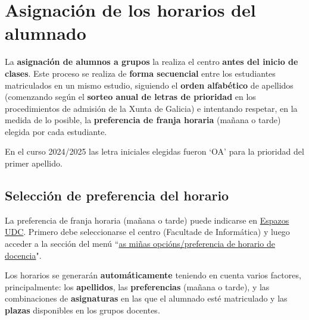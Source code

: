 \section{Asignación de los horarios del alumnado}

La \textbf{asignación de alumnos a grupos} la realiza el centro \textbf{antes del inicio de clases}. Este proceso se realiza de \textbf{forma secuencial} entre los estudiantes matriculados en un mismo estudio, siguiendo el \textbf{orden alfabético} de apellidos (comenzando según el \textbf{sorteo anual de letras de prioridad} en los procedimientos de admisión de la Xunta de Galicia) e intentando respetar, en la medida de lo posible, la \textbf{preferencia de franja horaria} (mañana o tarde) elegida por cada estudiante.

\begin{exampleBox}
    En el curso 2024/2025 las letra iniciales elegidas fueron `OA' para la prioridad del primer apellido.
\end{exampleBox}

\subsection{Selección de preferencia del horario}

La preferencia de franja horaria (mañana o tarde) puede indicarse en \href{\linkEspazosUDC}{Espazos UDC}. Primero debe seleccionarse el centro (Facultade de Informática) y luego acceder a la sección del menú ``\href{https://espazos.udc.es/centers/614/timetable/preference}{as miñas opcións/preferencia de horario de docencia}".

\FloatBarrier
\begin{figure}[htp]
    \centering
\end{figure}
\FloatBarrier

Los horarios se generarán \textbf{automáticamente} teniendo en cuenta varios factores, principalmente: los \textbf{apellidos}, las \textbf{preferencias} (mañana o tarde), y las combinaciones de \textbf{asignaturas} en las que el alumnado esté matriculado y las \textbf{plazas} disponibles en los grupos docentes.

